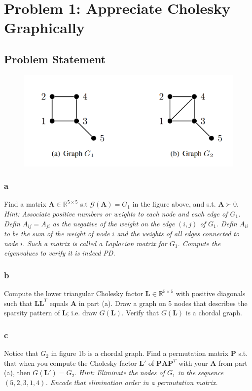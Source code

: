 \documentclass[11pt]{report}
\theoremstyle{definition}
\newcommand{\mat}[1]{\mathbf{#1}}
\begin{document}
\section*{Problem 1: Appreciate Cholesky Graphically}
\subsection*{Problem Statement}
\begin{figure}[h]
	\center
	\includegraphics[width=.8\textwidth]{graph_fig.png}
\end{figure}

\subsubsection*{a}
Find a matrix $\mat{A}\in\mathbb{R}^{5\times5}$ s.t $\mathcal{G}(\mat{A})=G_1$ in the figure
above, and s.t. $\mat{A}\succ0$.
\textit{Hint: Associate positive numbers or weights to each node and each edge
of $G_1$. Defin $A_{ij}=A_{ji}$ as the negative of the weight on the edge
$(i,j)$ of $G_1$. Defin $A_{ii}$ to be the sum of the weight of node $i$ and the
weights of all edges connected to node $i$. Such a matrix is called a Laplacian
matrix for $G_1$. Compute the eigenvalues to verify it is indeed PD.}

\subsubsection*{b}
Compute the lower triangular Cholesky factor $\mat{L}\in\mathbb{R}^{5\times5}$
with positive diagonals such that $\mat{L}\mat{L}^T$ equals $\mat{A}$ in part
(a). Draw a graph on 5 nodes that describes the sparsity pattern of $\mat{L}$;
i.e. draw $G(\mat{L})$. Verify that $G(\mat{L})$ is a chordal graph.

\subsubsection*{c}
Notice that $G_2$ in figure 1b is a chordal graph. Find a permutation matrix
$\mat{P}$ s.t. that when you compute the Cholesky factor $\mat{L}'$ of
$\mat{PAP}^T$ with your $\mat{A}$ from part (a), then $G(\mat{L}')=G_2$.
\textit{Hint: Eliminate the nodes of $G_1$ in the sequence $(5,2,3,1,4)$. Encode
	that elimination order in a permutation matrix.}
\end{document}
